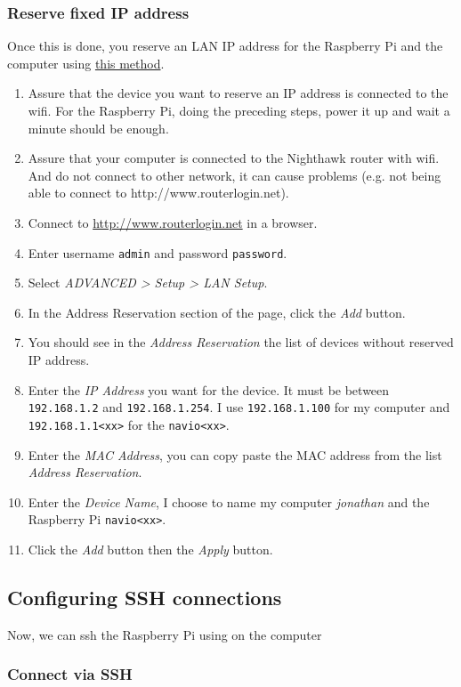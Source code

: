\subsubsection{Reserve fixed IP address}
Once this is done, you reserve an LAN IP address for the Raspberry Pi and the computer using \href{https://kb.netgear.com/24091/How-do-I-reserve-a-LAN-IP-address-on-my-Nighthawk-router}{this method}.
\begin{enumerate}
    \item Assure that the device you want to reserve an IP address is connected to the wifi. For the Raspberry Pi, doing the preceding steps, power it up and wait a minute should be enough.
    \item Assure that your computer is connected to the Nighthawk router with wifi. And do not connect to other network, it can cause problems (e.g. not being able to connect to http://www.routerlogin.net).
    \item Connect to \url{http://www.routerlogin.net} in a browser.
    \item Enter username \texttt{admin} and password \texttt{password}.
    \item Select \emph{ADVANCED > Setup > LAN Setup}.
    \item In the Address Reservation section of the page, click the \emph{Add} button.
    \item You should see in the \emph{Address Reservation} the list of devices without reserved IP address.
    \item Enter the \emph{IP Address} you want for the device. It must be between \texttt{192.168.1.2} and \texttt{192.168.1.254}. I use \texttt{192.168.1.100} for my computer and \texttt{192.168.1.1<xx>} for the \texttt{navio<xx>}.
    \item Enter the \emph{MAC Address}, you can copy paste the MAC address from the list \emph{Address Reservation}.
    \item Enter the \emph{Device Name}, I choose to name my computer \emph{jonathan} and the Raspberry Pi \texttt{navio<xx>}.
    \item Click the \emph{Add} button then the \emph{Apply} button.
\end{enumerate}

\subsection{Configuring SSH connections}
Now, we can ssh the Raspberry Pi using on the computer
\subsubsection{Connect via SSH}

